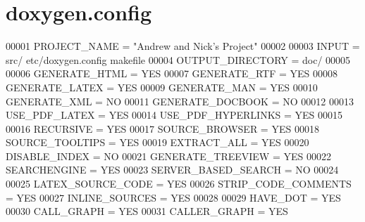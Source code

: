 \hypertarget{doxygen_8config_source}{\section{doxygen.\+config}
\label{doxygen_8config_source}
}

\begin{DoxyCode}
00001 PROJECT\_NAME = "Andrew and Nick's Project"
00002 
00003 INPUT = src/ etc/doxygen.config makefile 
00004 OUTPUT\_DIRECTORY = doc/
00005 
00006 GENERATE\_HTML = YES
00007 GENERATE\_RTF = YES
00008 GENERATE\_LATEX = YES
00009 GENERATE\_MAN = YES
00010 GENERATE\_XML = NO
00011 GENERATE\_DOCBOOK = NO
00012 
00013 USE\_PDF\_LATEX = YES
00014 USE\_PDF\_HYPERLINKS = YES
00015 
00016 RECURSIVE = YES
00017 SOURCE\_BROWSER = YES
00018 SOURCE\_TOOLTIPS = YES
00019 EXTRACT\_ALL = YES
00020 DISABLE\_INDEX = NO
00021 GENERATE\_TREEVIEW = YES
00022 SEARCHENGINE = YES
00023 SERVER\_BASED\_SEARCH = NO
00024 
00025 LATEX\_SOURCE\_CODE = YES
00026 STRIP\_CODE\_COMMENTS = YES
00027 INLINE\_SOURCES = YES
00028 
00029 HAVE\_DOT = YES
00030 CALL\_GRAPH = YES
00031 CALLER\_GRAPH = YES
\end{DoxyCode}
